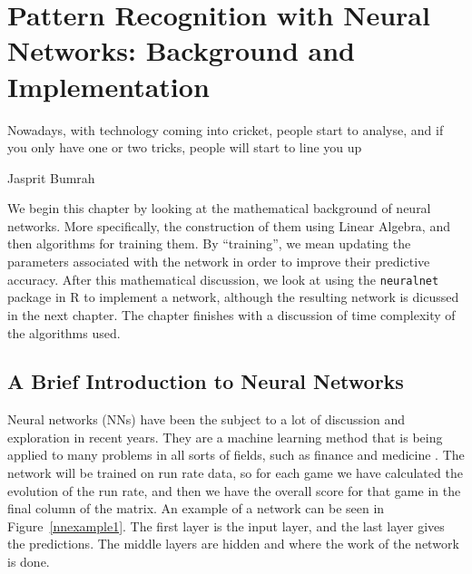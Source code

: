 \chapter{Pattern Recognition with Neural Networks: Background and Implementation}

\epigraph{Nowadays, with technology coming into cricket, people start to analyse, and if you only have one or two tricks, people will start to line you up}{Jasprit Bumrah}

We begin this chapter by looking at the mathematical background of neural networks. More specifically, the construction of them using Linear Algebra, and then algorithms 
for training them. By ``training'', we mean updating the parameters associated with the network in order to improve their predictive accuracy. After this mathematical discussion, 
we look at using the \verb|neuralnet| package in R to implement a network, although the resulting network is dicussed in the next chapter. The chapter finishes with a discussion of 
time complexity of the algorithms used.


\section{A Brief Introduction to Neural Networks}
Neural networks (NNs) have been the subject to a lot of discussion and exploration in recent years. They are a machine learning method that is being applied to many problems
in all sorts of fields, such as finance \cite{nnstock} and medicine \cite{nncancer}.  
The network will be trained on run rate data, so for each game we have calculated the evolution of the run rate,
and then we have the overall score for that game in the final column of the matrix. An example of a network can be seen in Figure~\ref{nnexample1}. The first layer is the 
input layer, and the last layer gives the predictions. The middle layers are hidden and where the work of the network is done. \\

